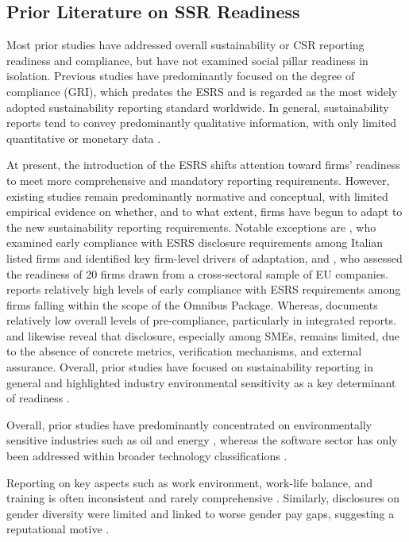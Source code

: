 \subsection{Prior Literature on SSR Readiness}
Most prior studies have addressed overall sustainability or CSR reporting readiness and compliance, 
but have not examined social pillar readiness in isolation. Previous studies have predominantly 
focused on the degree of compliance (GRI), which predates the ESRS 
and is regarded as the most widely adopted sustainability reporting standard worldwide. 
In general, sustainability reports tend to convey 
predominantly qualitative information, with only limited quantitative or monetary data \parencite{Michelon2015}.


At present, the introduction of the ESRS shifts attention toward firms' readiness to 
meet more comprehensive and mandatory reporting requirements. However, existing studies 
remain predominantly normative and conceptual, with limited empirical evidence 
on whether, and to what extent, firms have begun to adapt to the new sustainability 
reporting requirements. Notable exceptions are \textcite{Nicolo2025}, who examined early compliance with 
ESRS disclosure requirements among Italian listed firms and identified key firm-level drivers of 
adaptation, and \textcite{Filho2025}, who assessed the readiness of 20 firms drawn from a cross-sectoral 
sample of EU companies. \textcite{Nicolo2025} reports relatively high levels of early compliance 
with ESRS requirements among firms falling within the scope of the Omnibus Package. Whereas, 
\textcite{Raimo2025} documents relatively low overall levels of pre-compliance, 
particularly in integrated reports. \textcite{Filho2025} and \textcite{Montero2025} likewise reveal 
that disclosure, especially among SMEs, remains limited, due to the absence of concrete metrics, 
verification mechanisms, and external assurance. Overall, prior studies have focused on 
sustainability reporting in general and highlighted industry environmental sensitivity 
as a key determinant of readiness \parencite{Filho2025, Raimo2025, Nicolo2025, Montero2025}.



Overall, prior studies have predominantly 
concentrated on environmentally sensitive industries such as oil and energy \parencite{Filho2025, Raimo2025, Nicolo2025}, 
whereas the software sector has only been addressed within broader technology classifications \parencite{Montero2025}.


Reporting on key aspects such as work environment, work-life balance, 
and training is often inconsistent and rarely comprehensive \parencite{Greig2021}. Similarly,
disclosures on gender diversity were limited and linked to worse gender pay gaps,
suggesting a reputational motive \parencite{Huang2022}.

